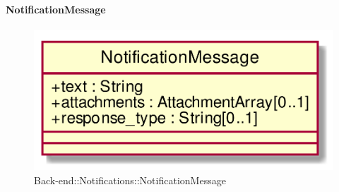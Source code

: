 \hypertarget{NotificationMessage_label}{\paragraph{NotificationMessage}}
\begin{figure}[h]
	\centering
	\includegraphics[width=\textwidth,height=\textheight,keepaspectratio]{images/ClassNotificationMessage.png}
	\caption{Back-end::Notifications::NotificationMessage}
\end{figure}
